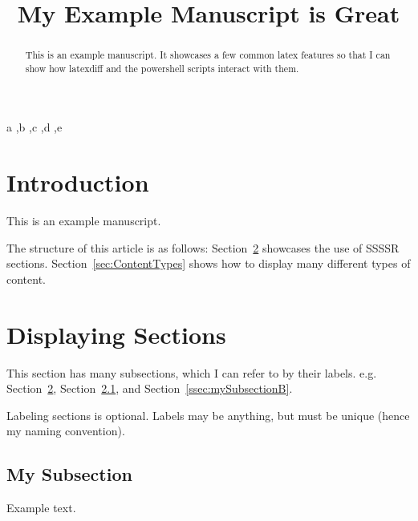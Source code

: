 \documentclass[preprint,3p,11pt,sort]{elsarticle}
\newcommand{\secref}[1]{Section~\ref{#1}}
\begin{document}
\begin{frontmatter}

\title{My Example Manuscript is Great}


\begin{abstract}
    This is an example manuscript. It showcases a few common latex features so that I can show how latexdiff and the powershell scripts interact with them.
\end{abstract}

\begin{keyword}
    a \sep b \sep c \sep d \sep e
\end{keyword}

\end{frontmatter}

\section{Introduction} \label{sec:intro}
This is an example manuscript.

The structure of this article is as follows: \secref{sec:mySection} showcases the use of SSSSR sections. \secref{sec:ContentTypes} shows how to display many different types of content.


\section{Displaying Sections} \label{sec:mySection}
This section has many subsections, which I can refer to by their labels. e.g. \secref{sec:mySection}, \secref{ssec:mySubsectionA}, and \secref{ssec:mySubsectionB}.

Labeling sections is optional. Labels may be anything, but must be unique (hence my naming convention).

\subsection{My Subsection} \label{ssec:mySubsectionA}
Example text.
\end{document}
